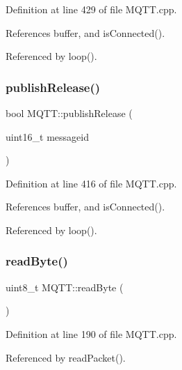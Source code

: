Definition at line 429 of file M\+Q\+T\+T.\+cpp.



References buffer, and is\+Connected().



Referenced by loop().

\mbox{\label{class_m_q_t_t_a3ec02b7dbe1fbea9f48ee3fc7cb3a9b8}} 
\subsubsection{\texorpdfstring{publish\+Release()}{publishRelease()}}
{\footnotesize\ttfamily bool M\+Q\+T\+T\+::publish\+Release (\begin{DoxyParamCaption}\item[{uint16\+\_\+t}]{messageid }\end{DoxyParamCaption})\hspace{0.3cm}{\ttfamily [private]}}



Definition at line 416 of file M\+Q\+T\+T.\+cpp.



References buffer, and is\+Connected().



Referenced by loop().

\mbox{\label{class_m_q_t_t_aad0854b6a156344e03926ab53f15adbd}} 
\subsubsection{\texorpdfstring{read\+Byte()}{readByte()}}
{\footnotesize\ttfamily uint8\+\_\+t M\+Q\+T\+T\+::read\+Byte (\begin{DoxyParamCaption}{ }\end{DoxyParamCaption})\hspace{0.3cm}{\ttfamily [private]}}



Definition at line 190 of file M\+Q\+T\+T.\+cpp.



Referenced by read\+Packet().

\mbox{\label{class_m_q_t_t_a78d0e70a566c983f13b002b88c467267}} 
